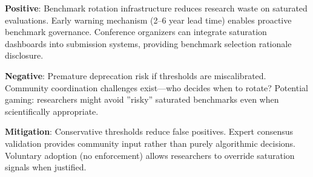 
\textbf{Positive}: Benchmark rotation infrastructure reduces research waste on saturated evaluations. Early warning mechanism (2--6 year lead time) enables proactive benchmark governance. Conference organizers can integrate saturation dashboards into submission systems, providing benchmark selection rationale disclosure.

\textbf{Negative}: Premature deprecation risk if thresholds are miscalibrated. Community coordination challenges exist---who decides when to rotate? Potential gaming: researchers might avoid ''risky'' saturated benchmarks even when scientifically appropriate.

\textbf{Mitigation}: Conservative thresholds reduce false positives. Expert consensus validation provides community input rather than purely algorithmic decisions. Voluntary adoption (no enforcement) allows researchers to override saturation signals when justified.
